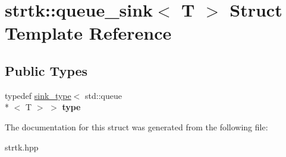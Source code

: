 \hypertarget{structstrtk_1_1queue__sink}{\section{strtk\-:\-:queue\-\_\-sink$<$ T $>$ Struct Template Reference}
\label{structstrtk_1_1queue__sink}
}
\subsection*{Public Types}
\begin{DoxyCompactItemize}
\item 
\hypertarget{structstrtk_1_1queue__sink_ab1fdadb5ecf4cea9aa873354c81a565f}{typedef \hyperlink{classstrtk_1_1sink__type}{sink\-\_\-type}$<$ std\-::queue\\*
$<$ T $>$ $>$ {\bfseries type}}\label{structstrtk_1_1queue__sink_ab1fdadb5ecf4cea9aa873354c81a565f}

\end{DoxyCompactItemize}


The documentation for this struct was generated from the following file\-:\begin{DoxyCompactItemize}
\item 
strtk.\-hpp\end{DoxyCompactItemize}
